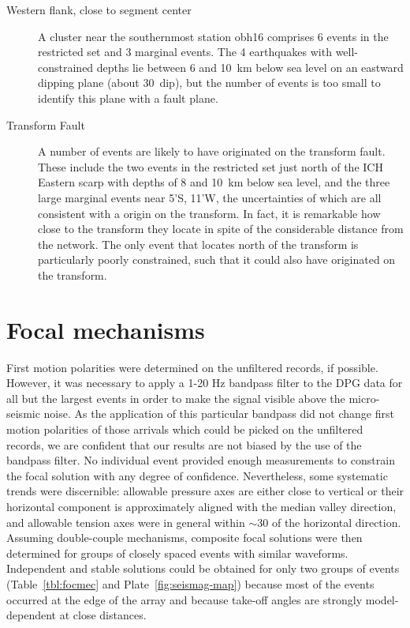 \documentclass[aguplus]{aguplus}
\newlength{\tw}
\begin{document}
\begin{article}
\begin{description}
\item[Western flank, close to segment center]
A cluster near the southernmost station obh16
comprises 6 events in the restricted set and 3 marginal events.
The 4 earthquakes with well-constrained depths lie between  6 and
10~km below sea level on an eastward
dipping plane (about 30\dg\ dip), but the number of events is too small to identify this
plane with a fault plane.

\item[Transform Fault]  A number of events are likely to have
originated on the transform fault.  These include the two events in the
restricted set just north of the ICH Eastern scarp with depths of
8 and 10~km below sea level, and the three
large marginal events near 5'S, 11'W, the uncertainties of
which are all consistent with a origin on the transform. In fact, it
is remarkable how close to the transform they locate in spite of  the
considerable distance from the network.  The only event that locates  north of the transform is
particularly poorly constrained, such that it could also have
originated on the transform.

\end{description}

\section{Focal mechanisms}

First motion polarities were determined on the unfiltered records, if
possible.  However, it was necessary to apply a 1-20 Hz bandpass
filter to the DPG data for
all but the largest events in order to make the signal visible above
the micro-seismic noise. As the application of this particular bandpass did not
change first motion polarities of those arrivals which could be picked on
the unfiltered records, we are confident that our results are not
biased by the use of the bandpass filter.
No individual event provided enough measurements to constrain the
focal solution with any degree of confidence. Nevertheless, some
systematic trends were discernible:  allowable pressure
axes are either close to vertical or their horizontal component is approximately aligned with the
median valley direction, and allowable tension axes were in general within
$\sim$30{\dg} of the horizontal direction.  Assuming double-couple
mechanisms, composite focal solutions
were then determined for groups of closely spaced events with similar
waveforms.   Independent and stable solutions could be obtained for
only two groups of events (Table~\ref{tbl:focmec} and Plate~\ref{fig:seismag-map})
because most of the events occurred at the edge of the array and
because take-off angles are strongly
model-dependent at close distances.


\end{article}
\end{document}
